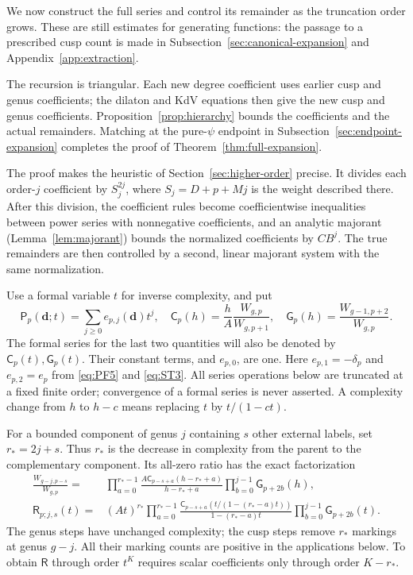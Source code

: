 We now construct the full series and control its remainder as the truncation order grows. These are still estimates for generating functions: the passage to a prescribed cusp count is made in Subsection~\ref{sec:canonical-expansion} and Appendix~\ref{app:extraction}.

The recursion is triangular. Each new degree coefficient uses earlier cusp and genus coefficients; the dilaton and KdV equations then give the new cusp and genus coefficients. Proposition~\ref{prop:hierarchy} bounds the coefficients and the actual remainders. Matching at the pure-$\psi$ endpoint in Subsection~\ref{sec:endpoint-expansion} completes the proof of Theorem~\ref{thm:full-expansion}.

The proof makes the heuristic of Section~\ref{sec:higher-order} precise. It divides each order-$j$ coefficient by $S_j^{2j}$, where $S_j=D+p+Mj$ is the weight described there. After this division, the coefficient rules become coefficientwise inequalities between power series with nonnegative coefficients, and an analytic majorant (Lemma~\ref{lem:majorant}) bounds the normalized coefficients by $CB^j$. The true remainders are then controlled by a second, linear majorant system with the same normalization.


Use a formal variable $t$ for inverse complexity, and put
\begin{equation}
 \mathsf P_p(\mathbf d;t)=\sum_{j\ge0}e_{p,j}(\mathbf d)t^j,
 \quad \mathsf C_p(h)=\frac hA\frac{W_{g,p}}{W_{g,p+1}},
 \quad \mathsf G_p(h)=\frac{W_{g-1,p+2}}{W_{g,p}}.
 \label{eq:FE1}
\end{equation}
The formal series for the last two quantities will also be denoted by
$\mathsf C_p(t),\mathsf G_p(t)$. Their constant terms, and $e_{p,0}$,
are one. Here $e_{p,1}=-\delta_p$ and $e_{p,2}=e_p$ from
\eqref{eq:PF5} and \eqref{eq:ST3}. All series operations below are
truncated at a fixed finite order; convergence of a formal series is
never asserted. A complexity change from $h$ to $h-c$ means replacing
$t$ by $t/(1-ct)$.

For a bounded component of genus $j$ containing $s$ other external
labels, set $r_*=2j+s$. Thus $r_*$ is the decrease in complexity
from the parent to the complementary component. Its all-zero ratio has the exact
factorization
\begin{equation}
\begin{split}
 \frac{W_{g-j,p-s}}{W_{g,p}}
 ={}&\prod_{a=0}^{r_*-1}
   \frac{A\mathsf C_{p-s+a}(h-r_*+a)}{h-r_*+a}
      \prod_{b=0}^{j-1}\mathsf G_{p+2b}(h),\\
 \mathsf R_{p;j,s}(t)
 ={}&(At)^{r_*}\prod_{a=0}^{r_*-1}
 \frac{\mathsf C_{p-s+a}(t/(1-(r_*-a)t))}{1-(r_*-a)t}
       \prod_{b=0}^{j-1}\mathsf G_{p+2b}(t).
\end{split}
 \label{eq:FE2}
\end{equation}
The genus steps have unchanged complexity; the cusp steps remove
$r_*$ markings at genus $g-j$. All their marking counts are positive
in the applications below. To obtain $\mathsf R$ through order $t^K$
requires scalar coefficients only through order $K-r_*$.

